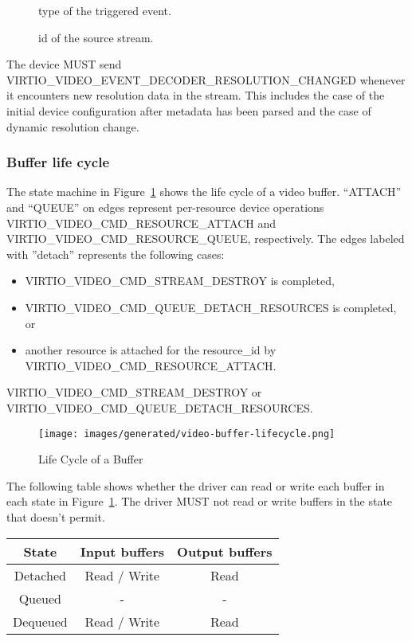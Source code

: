 \begin{description}
\item[] type of the triggered event.
\item[] id of the source stream.
\end{description}

The device MUST send VIRTIO_VIDEO_EVENT_DECODER_RESOLUTION_CHANGED whenever it
encounters new resolution data in the stream. This includes the case of the
initial device configuration after metadata has been parsed and the case of
dynamic resolution change.

\subsubsection{Buffer life cycle}
\label{sec:Device Types / Video Device / Device Operation / Buffer
  life cycle}

The state machine in Figure~\ref{fig:buffer-lifecycle} shows the life
cycle of a video buffer.
``ATTACH'' and ``QUEUE'' on edges represent per-resource device operations
VIRTIO_VIDEO_CMD_RESOURCE_ATTACH and VIRTIO_VIDEO_CMD_RESOURCE_QUEUE,
respectively.
The edges labeled with ''detach'' represents the following cases:
\begin{itemize}
\item VIRTIO_VIDEO_CMD_STREAM_DESTROY is completed,
\item VIRTIO_VIDEO_CMD_QUEUE_DETACH_RESOURCES is completed, or
\item another resource is attached for the resource_id by
  VIRTIO_VIDEO_CMD_RESOURCE_ATTACH.
\end{itemize}

VIRTIO_VIDEO_CMD_STREAM_DESTROY or VIRTIO_VIDEO_CMD_QUEUE_DETACH_RESOURCES.

\begin{figure}[h]
  \centering
  \texttt{[image: images/generated/video-buffer-lifecycle.png]}
  \caption{Life Cycle of a Buffer}
  \label{fig:buffer-lifecycle}
\end{figure}



The following table shows whether the driver can read or write each buffer in
each state in Figure~\ref{fig:buffer-lifecycle}. The driver MUST not read or
write buffers in the state that doesn't permit.
\begin{center}
  \begin{tabular}{|c|c|c|}
    \hline
    State & Input buffers & Output buffers \\
    \hline
    Detached & Read / Write & Read \\
    Queued   & -            & -    \\
    Dequeued & Read / Write & Read \\
    \hline
  \end{tabular}
\end{center}

